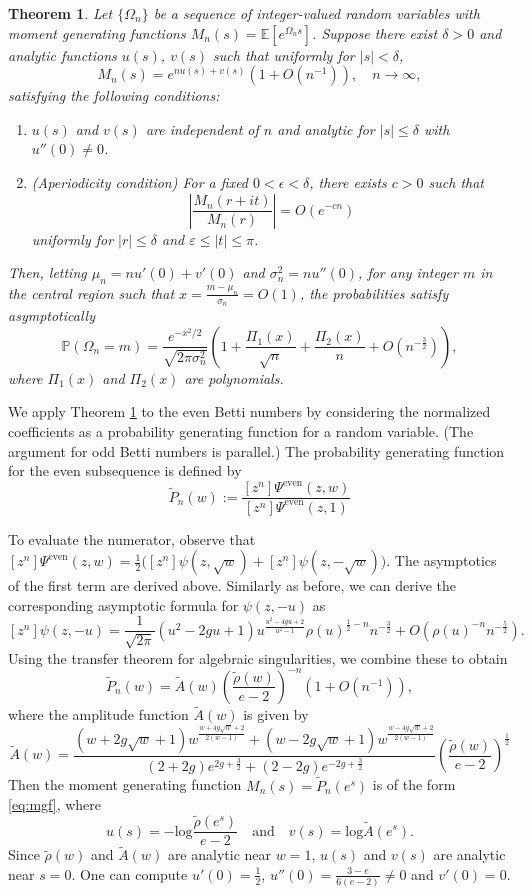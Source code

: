 \documentclass[11pt,letterpaper]{amsart}
\numberwithin{equation}{section}
\newtheorem{theorem}{Theorem}[section]
\theoremstyle{definition}
\newcommand{\PP}{\mathbb{P}}
\def\EE{\mathbb{E}}
\def\log{\mathrm{log} }
\def\beq{\begin{equation}}
\def\eeq{\end{equation}}
\begin{document}
\begin{theorem}\cite[Theorem 1]{HwangLLT}\label{LLT}
  Let $\{\Omega_n\}$ be a sequence of integer-valued random variables with moment generating functions $M_n(s)=\EE[e^{\Omega_n s}]$. Suppose there exist $\delta>0$ and analytic functions $u(s)$, $v(s)$ such that uniformly for $|s|<\delta$,
  \beq\label{eq:mgf} M_n(s) = e^{n u(s) +v(s)}\left(1+ O(n^{-1}) \right), \quad n\to \infty, \eeq
  satisfying the following conditions:
  \begin{enumerate}
    \item $u(s)$ and $v(s)$ are independent of $n$ and analytic for $|s|\le \delta$ with $u''(0)\ne 0$.
    \item \emph{(Aperiodicity condition)} For a fixed $0<\epsilon<\delta$, there exists $c>0$ such that
    \[ \left| \frac{M_n(r+it)}{M_n(r)}\right|=O(e^{-cn})\]
    uniformly for $|r|\le \delta$ and $\varepsilon \le |t|\le \pi$.
  \end{enumerate}
  Then, letting $\mu_n = n u'(0) +v'(0) $ and $\sigma_n^2 = n u''(0)$, for any integer $m$ in the central region such that $x =\frac{m-\mu_n}{\sigma_n}=O(1)$, the probabilities satisfy asymptotically
  \[ \PP(\Omega_n =m) = \frac{e^{-x^2/2}}{\sqrt{2 \pi \sigma_n^2}}\left( 1 + \frac{\Pi_1(x) }{\sqrt{n}} + \frac{\Pi_2(x) }{n}+ O\left( n^{-\frac{3}{2}}\right) \right),\]
  where $\Pi_1(x) $ and $\Pi_2(x) $ are polynomials.
\end{theorem}



We apply Theorem \ref{LLT} to the even Betti numbers by considering the normalized coefficients as a probability generating function for a random variable. (The argument for odd Betti numbers is parallel.) The probability generating function for the even subsequence is defined by
\[ \tilde{P}_n(w) :=  \frac{ [z^n]\Psi^\mathrm{even}(z, w) }{[z^n]\Psi^\mathrm{even}(z, 1)} \]

To evaluate the numerator, observe that $[z^n]\Psi^\mathrm{even}(z, w) = \frac{1}{2}\big([z^n]\psi(z, \sqrt{w}) + [z^n]\psi(z, -\sqrt{w})\big)$. The asymptotics of the first term are derived above. Similarly as before, we can derive the corresponding asymptotic formula for $\psi(z, -u)$ as
\[ [z^n]\psi(z,-u) = \frac{1}{\sqrt{2\pi}}(u^2-2gu+1) u^{\frac{u^2-4gu+2}{u^2-1}}\rho(u)^{\frac12-n}n^{-\frac32} +O(\rho(u)^{-n}n^{-\frac52}). \]
Using the transfer theorem for algebraic singularities, we combine these to obtain
\[ \tilde{P}_n(w) =\tilde{A}(w) \left(\frac{\tilde{\rho}(w)}{e-2}\right)^{-n}  \left(1+O(n^{-1})\right),\]
where the amplitude function $  \tilde{A}(w)  $ is given by
\[  \tilde{A}(w) = \frac{(w+2g\sqrt{w} +1) w^{\frac{w+4g\sqrt{w} +2}{2(w-1)}}+(w-2g\sqrt{w} +1) w^{\frac{w-4g\sqrt{w} +2}{2(w-1)}}}{(2+2g)e^{2g+\frac32}+(2-2g)e^{-2g+\frac32}} \left(\frac{\tilde{\rho}(w)}{e-2}\right)^{\frac12} \]
Then the moment generating function $M_n(s) =\tilde{P}_n(e^s)$ is of the form \eqref{eq:mgf}, where
\[ u(s) = -\log \frac{\tilde{\rho}(e^s)}{e-2}\quad \text{and} \quad v(s) = \log\tilde{A}(e^s). \]
Since $\tilde{\rho}(w)$ and $\tilde{A}(w)$ are analytic near $w=1$, $u(s)$ and $v(s)$ are analytic near $s=0$. One can compute $u'(0)= \frac12$, $u''(0)= \frac{3-e}{6(e-2)}\ne 0$ and $v'(0)=0$.
\end{document}
